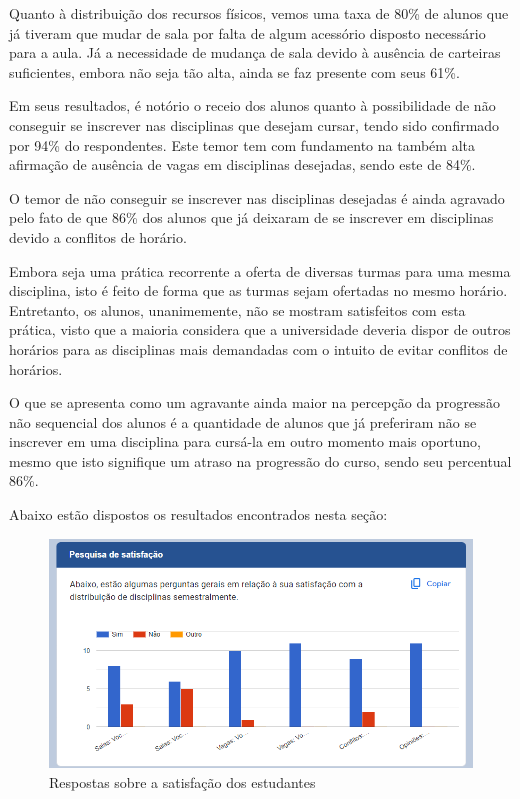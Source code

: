         Quanto à distribuição dos recursos físicos, vemos uma taxa de 80\% de alunos que já tiveram que mudar de sala por falta de algum acessório disposto necessário para a aula. Já a necessidade de mudança de sala devido à ausência de carteiras suficientes, embora não seja tão alta, ainda se faz presente com seus 61\%.

        Em seus resultados, é notório o receio dos alunos quanto à possibilidade de não conseguir se inscrever nas disciplinas que desejam cursar, tendo sido confirmado por 94\% do respondentes. Este temor tem com fundamento na também alta afirmação de ausência de vagas em disciplinas desejadas, sendo este de 84\%.

        O temor de não conseguir se inscrever nas disciplinas desejadas é ainda agravado pelo fato de que 86\% dos alunos que já deixaram de se inscrever em disciplinas devido a conflitos de horário.

        Embora seja uma prática recorrente a oferta de diversas turmas para uma mesma disciplina, isto é feito de forma que as turmas sejam ofertadas no mesmo horário. Entretanto, os alunos, unanimemente, não se mostram satisfeitos com esta prática, visto que a maioria considera que a universidade deveria dispor de outros horários para as disciplinas mais demandadas com o intuito de evitar conflitos de horários.

        O que se apresenta como um agravante ainda maior na percepção da progressão não sequencial dos alunos é a quantidade de alunos que já preferiram não se inscrever em uma disciplina para cursá-la em outro momento mais oportuno, mesmo que isto signifique um atraso na progressão do curso, sendo seu percentual 86\%.

        Abaixo estão dispostos os resultados encontrados nesta seção:

        \begin{figure}[htbp]\centering
            \caption{\label{fig:2_Satisfacao} Respostas sobre a satisfação dos estudantes}
            \includegraphics[scale=0.8]{files/img/forms/2.0-Satisfacao.png}
        \end{figure} %

